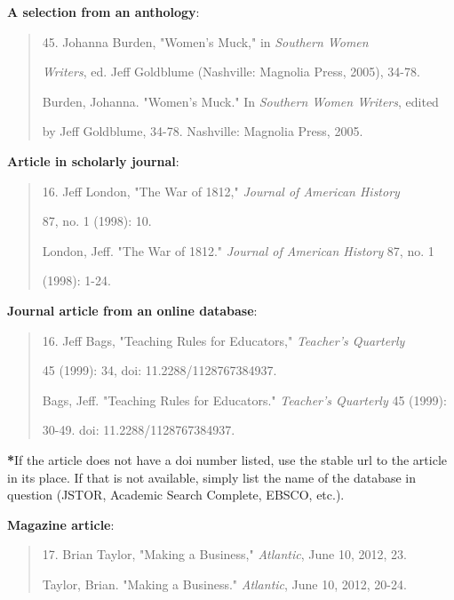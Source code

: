 \textbf{A selection from an anthology}:
\begin{quote}

\hspace{.4in}45. Johanna Burden, "Women's Muck," in \emph{Southern Women} 

\emph{Writers}, ed. Jeff Goldblume (Nashville: Magnolia Press, 2005), 34-78.

\medskip

Burden, Johanna. "Women's Muck." In \emph{Southern Women Writers}, edited

\hspace{.4in}by Jeff Goldblume, 34-78. Nashville: Magnolia Press, 2005.
\end{quote}

\textbf{Article in scholarly journal}:
\begin{quote}
 \hspace{.4in}16. Jeff London, "The War of 1812," \emph{Journal of American History} 
 
 87, no. 1 (1998): 10.
 
\medskip

London, Jeff. "The War of 1812." \emph{Journal of American History} 87, no. 1

\hspace{.4in}(1998): 1-24.
\end{quote}

\textbf{Journal article from an online database}:
\begin{quote}

\hspace{.4in}16. Jeff Bags, "Teaching Rules for Educators," \emph{Teacher's Quarterly} 

45 (1999): 34, doi: 11.2288/1128767384937.

\medskip

Bags, Jeff. "Teaching Rules for Educators." \emph{Teacher's Quarterly} 45 (1999):

\hspace{.4in}30-49. doi: 11.2288/1128767384937.
\end{quote}

\textbf{*}If the article does not have a doi number listed, use the stable url to the 
article in its place. If that is not available, simply list the name of the database in 
question (JSTOR, Academic Search Complete, EBSCO, etc.).

\medskip
\textbf{Magazine article}:
\begin{quote}

\hspace{.4in}17. Brian Taylor, "Making a Business," \emph{Atlantic}, June 10, 2012, 23.

\medskip

Taylor, Brian. "Making a Business." \emph{Atlantic}, June 10, 2012, 20-24.
\end{quote}


